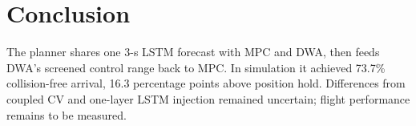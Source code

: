 \documentclass[conference,letterpaper]{IEEEtran}
\begin{document}
\section{Conclusion}
The planner shares one 3-s LSTM forecast with MPC and DWA, then feeds DWA's screened control range back to MPC. In simulation it achieved 73.7\% collision-free arrival, 16.3 percentage points above position hold. Differences from coupled CV and one-layer LSTM injection remained uncertain; flight performance remains to be measured.


{\footnotesize}
\end{document}
